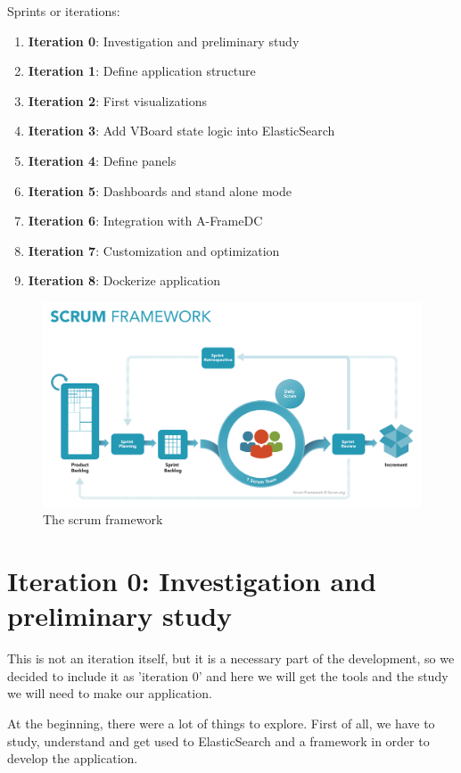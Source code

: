 \documentclass[a4paper, 12pt]{book}
\begin{document}
Sprints or iterations:
\begin{enumerate}
\item \textbf{Iteration 0}: Investigation and preliminary study
\item \textbf{Iteration 1}: Define application structure
\item \textbf{Iteration 2}: First visualizations
\item \textbf{Iteration 3}: Add VBoard state logic into ElasticSearch
\item \textbf{Iteration 4}: Define panels
\item \textbf{Iteration 5}: Dashboards and stand alone mode
\item \textbf{Iteration 6}: Integration with A-FrameDC
\item \textbf{Iteration 7}: Customization and optimization
\item \textbf{Iteration 8}: Dockerize application
\end{enumerate}

\begin{figure}[!htb]
  \centering
  \includegraphics[width=15cm, keepaspectratio]{img/development/SCRUM}
  \caption{The scrum framework}
  \label{fig:scrum}
\end{figure}

\section{Iteration 0: Investigation and preliminary study} 
\label{sec:it0}
This is not an iteration itself, but it is a necessary part of the development, so we decided to include it as 'iteration 0' and here we will get the tools and the study we will need to make our application. 

At the beginning, there were a lot of things to explore. First of all, we have to study, understand and get used to ElasticSearch and a framework in order to develop the application.
\end{document}
